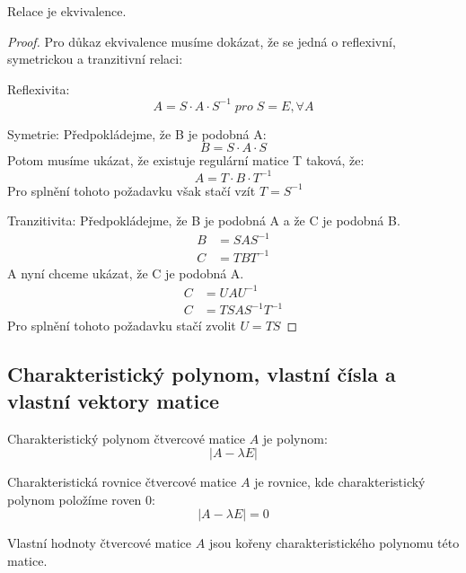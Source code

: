 \begin{theorem}
    Relace  je ekvivalence.
\end{theorem}
\begin{proof}
    Pro důkaz ekvivalence musíme dokázat, že se jedná o reflexivní, symetrickou a tranzitivní
    relaci:

    Reflexivita:
    $$A = S\cdot A\cdot S^{-1}\; pro\; S=E,  \forall A$$

    Symetrie: Předpokládejme, že B je podobná A:
    $$B = S\cdot A \cdot S$$
    Potom musíme ukázat, že existuje regulární matice T taková, že:
    $$A = T \cdot B \cdot T^{-1}$$
    Pro splnění tohoto požadavku však stačí vzít $T = S^{-1}$

    Tranzitivita:
    Předpokládejme, že B je podobná A a že C je podobná B.
    \begin{align*}
        B &= SAS^{-1}\\
        C &= TBT^{-1}
    \end{align*}
    A nyní chceme ukázat, že C je podobná A.
    \begin{align*}
        C &= UAU^{-1}\\
        C &= TSAS^{-1}T^{-1}
    \end{align*}
    Pro splnění tohoto požadavku stačí zvolit $U = TS$
\end{proof}

\subsection{Charakteristický polynom, vlastní čísla a vlastní vektory matice}
\begin{definition}
    Charakteristický polynom čtvercové matice $A$ je polynom:
    $$|A - \lambda E|$$
\end{definition}

\begin{definition}
    Charakteristická rovnice čtvercové matice $A$ je rovnice, kde charakteristický polynom
    položíme roven 0:
    $$|A - \lambda E| = 0$$
\end{definition}

\begin{definition}
    Vlastní hodnoty čtvercové matice $A$ jsou kořeny charakteristického polynomu této matice.
\end{definition}

